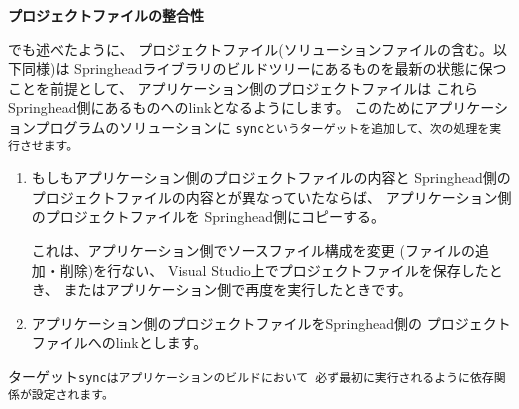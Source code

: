 \bigskip
\noindent
\bf{プロジェクトファイルの整合性}
\begin{narrow}[20pt]
	でも述べたように、
	プロジェクトファイル(ソリューションファイルの含む。以下同様)は
	Springheadライブラリのビルドツリーにあるものを最新の状態に保つことを前提として、
	アプリケーション側のプロジェクトファイルは
	これらSpringhead側にあるものへのlinkとなるようにします。
	このためにアプリケーションプログラムのソリューションに
	\tt{sync}というターゲットを追加して、次の処理を実行させます。
	\begin{enumerate}
	  \item	もしもアプリケーション側のプロジェクトファイルの内容と
		Springhead側のプロジェクトファイルの内容とが異なっていたならば、
		アプリケーション側のプロジェクトファイルを
		Springhead側にコピーする。
		\begin{narrow}[s][15pt]
		これは、アプリケーション側でソースファイル構成を変更
		(ファイルの追加・削除)を行ない、
		Visual Studio上でプロジェクトファイルを保存したとき、
		またはアプリケーション側で再度\cmake を実行したときです。
		\end{narrow}

	  \item	アプリケーション側のプロジェクトファイルをSpringhead側の
		プロジェクトファイルへのlinkとします。
	\end{enumerate}
	ターゲット\tt{sync}はアプリケーションのビルドにおいて
	必ず最初に実行されるように依存関係が設定されます。
\end{narrow}	
